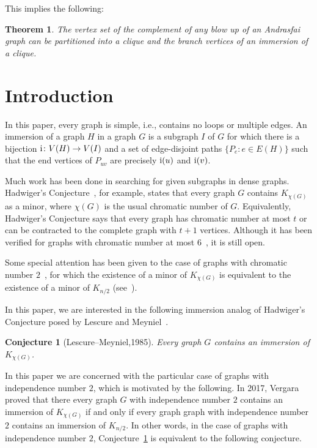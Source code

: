 \documentclass[a4paper,12pt]{article}
\newtheorem{theorem}{Theorem}
\newtheorem{conjecture}{Conjecture}
\newcommand{\ifun}{{\rm i}}
\begin{document}
This implies the following: 

\begin{theorem}
 The vertex set of the complement of any blow up of an Andrasfai graph can be partitioned 
 into a clique and the branch vertices of an immersion of a clique. 
\end{theorem}

\section{Introduction}

In this paper, every graph is simple, i.e., contains no loops or multiple edges.
An immersion of a graph \(H\) in a graph \(G\)
is a subgraph \(I\) of \(G\) for which there is a bijection \(\ifun \colon V(H) \to V(I)\)
and a set of edge-disjoint paths \(\{P_e : e \in E(H)\}\) 
such that the end vertices of \(P_{uv}\) are precisely \(\ifun(u)\) and \(\ifun(v)\).

Much work has been done in searching for given subgraphs in dense graphs.
Hadwiger's Conjecture~\cite{hadwiger1943klassifikation}, for example,
states that every graph \(G\) contains \(K_{\chi(G)}\) as a minor,
where \(\chi(G)\) is the usual chromatic number of \(G\).
Equivalently, Hadwiger's Conjecture says that every graph has chromatic number at most \(t\)
or can be contracted to the complete graph with \(t+1\) vertices.
Although it has been verified for graphs with chromatic number at most \(6\)~\cite{robertson1993hadwiger}, it is still open.

Some special attention has been given to the case of graphs with chromatic number \(2\)~\cite{seymour2016hadwiger},
for which the existence of a minor of \(K_{\chi(G)}\) is equivalent to the existence of a minor of \(K_{n/2}\) (see~\cite{plummer2003special}).

In this paper, we are interested in the following immersion analog of Hadwiger's Conjecture posed by Lescure and Meyniel~\cite{lescure41problem}.

\begin{conjecture}[Lescure--Meyniel,1985]\label{conj:LescureMeyniel}
	Every graph \(G\) contains an immersion of \(K_{\chi(G)}\).
\end{conjecture}

In this paper we are concerned with the particular case of graphs with independence number \(2\),
which is motivated by the following.
In 2017, Vergara~\cite{vergara2017complete} proved that there every graph \(G\) with independence number \(2\)
contains an immersion of \(K_{\chi(G)}\) if and only if every graph graph with independence number \(2\) contains an immersion of \(K_{n/2}\). 
In other words, in the case of graphs with independence number \(2\),
Conjecture~\ref{conj:LescureMeyniel} is equivalent to the following conjecture.
\end{document}
